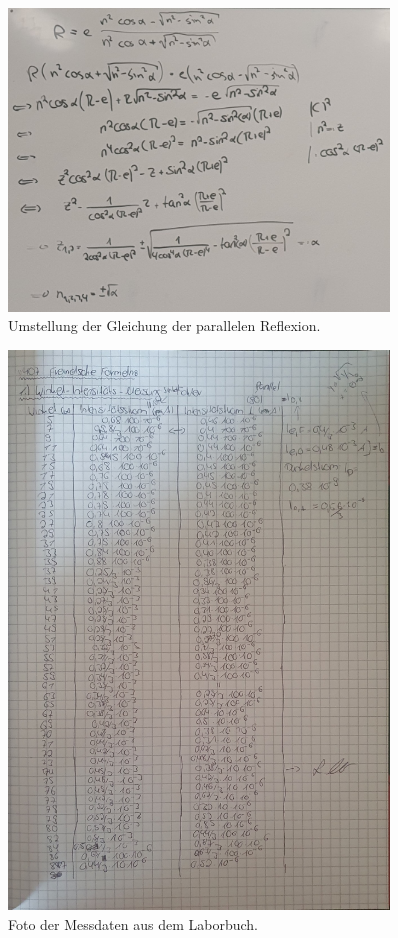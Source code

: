 \begin{figure}[H]
    \centering
    \includegraphics[width=0.9\textwidth]{Gleichung21.jpg}
    \caption{Umstellung der Gleichung der parallelen Reflexion.}
\end{figure}

\begin{figure}[H]
    \centering
    \includegraphics[width=0.9\textwidth]{Laborbuch.jpg}
    \caption{Foto der Messdaten aus dem Laborbuch.}
\end{figure}





